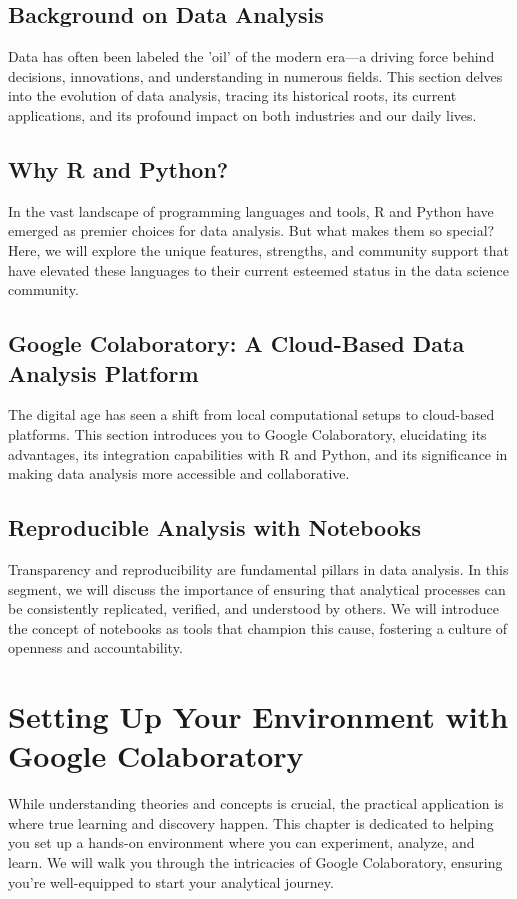 \documentclass[a4paper,12pt]{book}
\begin{document}
\section{Background on Data Analysis}
Data has often been labeled the 'oil' of the modern era—a driving force behind decisions, innovations, and understanding in numerous fields. This section delves into the evolution of data analysis, tracing its historical roots, its current applications, and its profound impact on both industries and our daily lives.

\section{Why R and Python?}
In the vast landscape of programming languages and tools, R and Python have emerged as premier choices for data analysis. But what makes them so special? Here, we will explore the unique features, strengths, and community support that have elevated these languages to their current esteemed status in the data science community.

\section{Google Colaboratory: A Cloud-Based Data Analysis Platform}
The digital age has seen a shift from local computational setups to cloud-based platforms. This section introduces you to Google Colaboratory, elucidating its advantages, its integration capabilities with R and Python, and its significance in making data analysis more accessible and collaborative.

\section{Reproducible Analysis with Notebooks}
Transparency and reproducibility are fundamental pillars in data analysis. In this segment, we will discuss the importance of ensuring that analytical processes can be consistently replicated, verified, and understood by others. We will introduce the concept of notebooks as tools that champion this cause, fostering a culture of openness and accountability.

\chapter{Setting Up Your Environment with Google Colaboratory}
While understanding theories and concepts is crucial, the practical application is where true learning and discovery happen. This chapter is dedicated to helping you set up a hands-on environment where you can experiment, analyze, and learn. We will walk you through the intricacies of Google Colaboratory, ensuring you're well-equipped to start your analytical journey.
\end{document}
